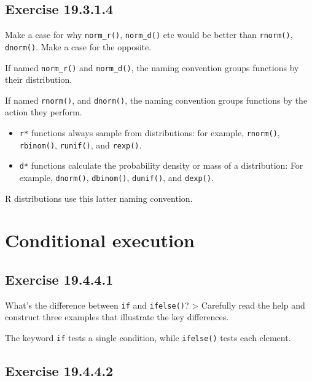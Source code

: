 \documentclass[]{book}
\theoremstyle{plain}
\theoremstyle{remark}
\begin{document}
\hypertarget{exercise-19.3.1.4}{%
\subsection*{\texorpdfstring{Exercise
{19.3.1.4}}{Exercise 19.3.1.4}}\label{exercise-19.3.1.4}}

Make a case for why \texttt{norm\_r()}, \texttt{norm\_d()} etc would be
better than \texttt{rnorm()}, \texttt{dnorm()}. Make a case for the
opposite.

If named \texttt{norm\_r()} and \texttt{norm\_d()}, the naming
convention groups functions by their distribution.

If named \texttt{rnorm()}, and \texttt{dnorm()}, the naming convention
groups functions by the action they perform.

\begin{itemize}
\item
  \texttt{r*} functions always sample from distributions: for example,
  \texttt{rnorm()}, \texttt{rbinom()}, \texttt{runif()}, and
  \texttt{rexp()}.
\item
  \texttt{d*} functions calculate the probability density or mass of a
  distribution: For example, \texttt{dnorm()}, \texttt{dbinom()},
  \texttt{dunif()}, and \texttt{dexp()}.
\end{itemize}

R distributions use this latter naming convention.

\hypertarget{conditional-execution}{%
\section{Conditional execution}\label{conditional-execution}}

\hypertarget{exercise-19.4.4.1}{%
\subsection*{\texorpdfstring{Exercise
{19.4.4.1}}{Exercise 19.4.4.1}}\label{exercise-19.4.4.1}}

What's the difference between \texttt{if} and \texttt{ifelse()}?
\textgreater{} Carefully read the help and construct three examples that
illustrate the key differences.

The keyword \texttt{if} tests a single condition, while
\texttt{ifelse()} tests each element.

\hypertarget{exercise-19.4.4.2}{%
\subsection*{\texorpdfstring{Exercise
{19.4.4.2}}{Exercise 19.4.4.2}}\label{exercise-19.4.4.2}}
\end{document}
